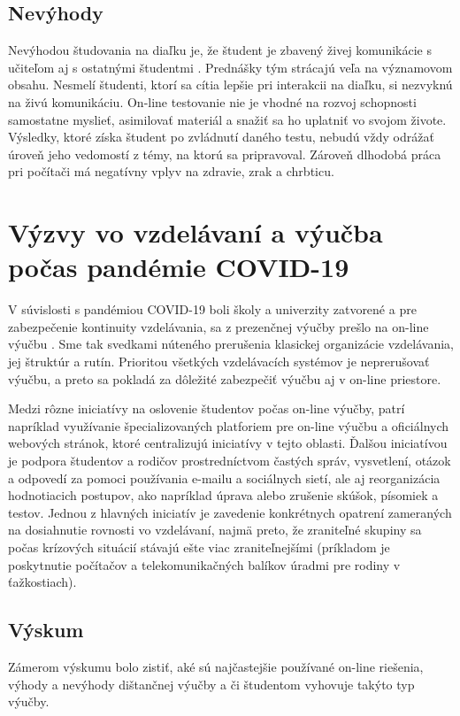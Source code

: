 \documentclass[10pt,oneside,slovak,a4paper]{article}
\begin{document}
\subsection{Nevýhody}
Nevýhodou študovania na diaľku je, že študent je zbavený živej komunikácie s učiteľom aj s ostatnými študentmi \cite{Sokolova2018}. Prednášky tým strácajú veľa na významovom obsahu.
Nesmelí študenti, ktorí sa cítia lepšie pri interakcii na diaľku, si nezvyknú na živú komunikáciu.
On-line testovanie nie je vhodné na rozvoj schopnosti samostatne myslieť, asimilovať materiál a snažiť sa ho uplatniť vo svojom živote.
Výsledky, ktoré získa študent po zvládnutí daného testu, nebudú vždy odrážať úroveň jeho vedomostí z témy, na ktorú sa pripravoval.
Zároveň dlhodobá práca pri počítači má negatívny vplyv na zdravie, zrak a chrbticu.


\section{Výzvy vo vzdelávaní a výučba počas pandémie COVID-19}
V súvislosti s pandémiou COVID-19 boli školy a univerzity zatvorené a pre zabezpečenie kontinuity vzdelávania, sa z prezenčnej výučby prešlo na on-line výučbu \cite{covid19}.
Sme tak svedkami núteného prerušenia klasickej organizácie vzdelávania, jej štruktúr a rutín. Prioritou všetkých vzdelávacích systémov je neprerušovať výučbu,
a preto sa pokladá za dôležité zabezpečiť výučbu aj v on-line priestore.

Medzi rôzne iniciatívy na oslovenie študentov počas on-line výučby, patrí napríklad využívanie špecializovaných platforiem pre on-line výučbu a oficiálnych webových stránok,
ktoré centralizujú iniciatívy v tejto oblasti. Ďalšou iniciatívou je podpora študentov a rodičov prostredníctvom častých správ, vysvetlení, otázok a odpovedí za pomoci používania e-mailu a sociálnych sietí,
ale aj reorganizácia hodnotiacich postupov, ako napríklad úprava alebo zrušenie skúšok, písomiek a testov. Jednou z hlavných iniciatív je zavedenie konkrétnych opatrení zameraných na dosiahnutie rovnosti vo vzdelávaní,
najmä preto, že zraniteľné skupiny sa počas krízových situácií stávajú ešte viac zraniteľnejšími (príkladom je poskytnutie počítačov a telekomunikačných balíkov úradmi pre rodiny v ťažkostiach).  %

\subsection{Výskum}
Zámerom výskumu bolo zistiť, aké sú najčastejšie používané on-line riešenia, výhody a nevýhody dištančnej výučby a či študentom vyhovuje takýto typ výučby. \cite{covid19} 
\end{document}
